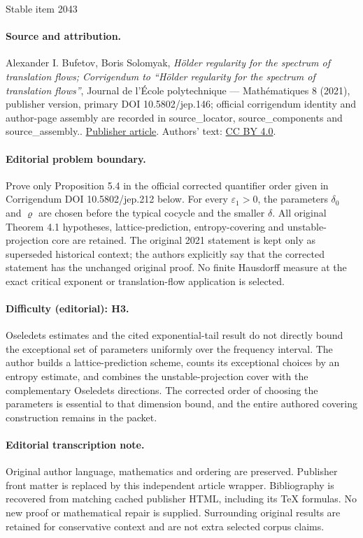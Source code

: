 \documentclass[11pt]{article}
\numberwithin{equation}{section}\newcommand{\Relation}[2][]{}\newtheorem*{prop*}{Proposition}
\let\epsilon\varepsilon
\theoremstyle{plain}
\theoremstyle{definition}
\begin{document}
\begin{center}{\Large Stable item 2043}\end{center}
\paragraph{Source and attribution.}
Alexander I. Bufetov, Boris Solomyak, \emph{Hölder regularity for the spectrum of translation flows; Corrigendum to “Hölder regularity for the spectrum of translation flows”}, Journal de l’École polytechnique — Mathématiques 8 (2021), publisher version, primary DOI 10.5802/jep.146; official corrigendum identity and author-page assembly are recorded in source\_locator, source\_components and source\_assembly.. \href{https://jep.centre-mersenne.org/articles/10.5802/jep.146/}{Publisher article}. Authors' text: \href{https://creativecommons.org/licenses/by/4.0/}{CC BY 4.0}.
\paragraph{Editorial problem boundary.}
Prove only Proposition 5.4 in the official corrected quantifier order given in Corrigendum DOI 10.5802/jep.212 below. For every \(\epsilon_1>0\), the parameters \(\delta_0\) and \(\varrho\) are chosen before the typical cocycle and the smaller \(\delta\). All original Theorem 4.1 hypotheses, lattice-prediction, entropy-covering and unstable-projection core are retained. The original 2021 statement is kept only as superseded historical context; the authors explicitly say that the corrected statement has the unchanged original proof. No finite Hausdorff measure at the exact critical exponent or translation-flow application is selected.
\paragraph{Difficulty (editorial): H3.}
Oseledets estimates and the cited exponential-tail result do not directly bound the exceptional set of parameters uniformly over the frequency interval. The author builds a lattice-prediction scheme, counts its exceptional choices by an entropy estimate, and combines the unstable-projection cover with the complementary Oseledets directions. The corrected order of choosing the parameters is essential to that dimension bound, and the entire authored covering construction remains in the packet.
\paragraph{Editorial transcription note.}
Original author language, mathematics and ordering are preserved. Publisher front matter is replaced by this independent article wrapper. Bibliography is recovered from matching cached publisher HTML, including its TeX formulas. No new proof or mathematical repair is supplied. Surrounding original results are retained for conservative context and are not extra selected corpus claims.
\clearpage
\end{document}
